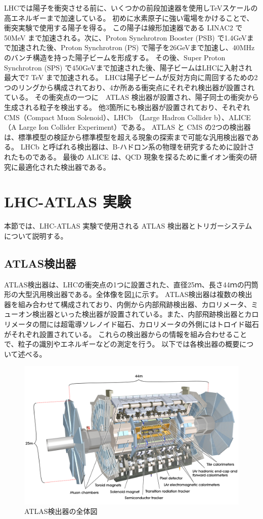 LHCでは陽子を衝突させる前に、いくつかの前段加速器を使用しTeVスケールの高エネルギーまで加速している。
初めに水素原子に強い電場をかけることで、衝突実験で使用する陽子を得る。
この陽子は線形加速器である LINAC2 で 50MeV まで加速される。次に、Proton Synchrotron Booster (PSB) で1.4GeVまで加速された後、Proton Synchrotron (PS) で陽子を26GeVまで加速し、40MHzのバンチ構造を持った陽子ビームを形成する。
その後、Super Proton Synchrotron (SPS) で450GeVまで加速された後、陽子ビームはLHCに入射され最大で7 TeV まで加速される。
LHCは陽子ビームが反対方向に周回するための2つのリングから構成されており、4か所ある衝突点にそれぞれ検出器が設置されている。
その衝突点の一つに　ATLAS 検出器が設置され、陽子同士の衝突から生成される粒子を検出する。
他3箇所にも検出器が設置されており、それぞれCMS（Compact Muon Solenoid）、LHCb （Large Hadron Collider b）、ALICE （A Large Ion Collider Experiment）である。
ATLAS と CMS の2つの検出器は、標準模型の検証から標準模型を超える現象の探索まで可能な汎用検出器である。
LHCb と呼ばれる検出器は、B-ハドロン系の物理を研究するために設計されたものである。
最後の ALICE は、QCD 現象を探るために重イオン衝突の研究に最適化された検出器である。

\section{LHC-ATLAS 実験}
\label{section2-2}
本節では、LHC-ATLAS 実験で使用される ATLAS 検出器とトリガーシステムについて説明する。

\subsection{ATLAS検出器}
ATLAS検出器は、LHCの衝突点の1つに設置された、直径25ｍ、長さ44ｍの円筒形の大型汎用検出器である。全体像を図\ref{fig:ATLAS検出器}に示す。
ATLAS検出器は複数の検出器を組み合わせて構成されており、内側から内部飛跡検出器、カロリメータ、ミューオン検出器といった検出器が設置されている。また、内部飛跡検出器とカロリメータの間には超電導ソレノイド磁石、カロリメータの外側にはトロイド磁石がそれぞれ設置されている。
これらの検出器からの情報を組み合わせることで、粒子の識別やエネルギーなどの測定を行う。
以下では各検出器の概要について述べる。

\begin{figure}[tb]
  \centering
  \includegraphics[clip,width=14cm]{fig/2/0803012_01.jpg}
  \caption{ATLAS検出器の全体図}
  \label{fig:ATLAS検出器}
\end{figure}


